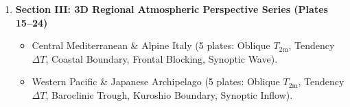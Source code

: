 \documentclass[11pt,a4paper]{article}
\begin{document}
\begin{tcolorbox}[colback=panelbg,colframe=panelborder,arc=2mm,title={\bfseries Thematic Visual Architecture (Part 1: Pillars \& 3D Series)},coltitle=navyblue]
\begin{enumerate}[leftmargin=*,noitemsep]
    \vspace{0.1cm}
    \item \textbf{Section III: 3D Regional Atmospheric Perspective Series (Plates 15--24)}
    \begin{itemize}[noitemsep]
        \item Central Mediterranean \& Alpine Italy (5 plates: Oblique $T_{2\text{m}}$, Tendency $\Delta T$, Coastal Boundary, Frontal Blocking, Synoptic Wave).
        \item Western Pacific \& Japanese Archipelago (5 plates: Oblique $T_{2\text{m}}$, Tendency $\Delta T$, Baroclinic Trough, Kuroshio Boundary, Synoptic Inflow).
    \end{itemize}
\end{enumerate}
\end{tcolorbox}
\clearpage

\end{document}
